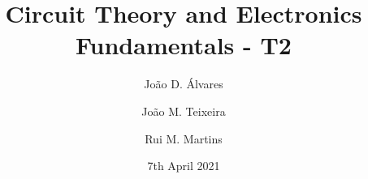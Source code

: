 \title{\textbf{Circuit Theory and Electronics Fundamentals - T2}}
\author[1]{João D. Álvares}
\author[1]{João M. Teixeira}
\author[1]{Rui M. Martins}


\date{7th April 2021}